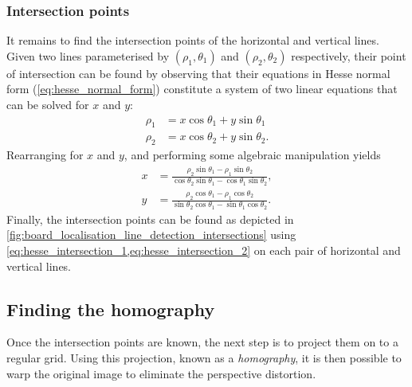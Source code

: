 \documentclass[../report.tex]{subfiles}
\begin{document}
\subsubsection{Intersection points}
It remains to find the intersection points of the horizontal and vertical lines.
Given two lines parameterised by $(\rho_1,\theta_1)$ and $(\rho_2,\theta_2)$ respectively, their point of intersection can be found by observing that their equations in Hesse normal form (\cref{eq:hesse_normal_form}) constitute a system of two linear equations that can be solved for $x$ and $y$:
\begin{align*}
    \rho_1 &= x \cos \theta_1 + y \sin \theta_1 \\
    \rho_2 &= x \cos \theta_2 + y \sin \theta_2.
\end{align*}
Rearranging for $x$ and $y$, and performing some algebraic manipulation yields
\begin{align}
    \label{eq:hesse_intersection_1}
    x &= \frac{\rho_2 \sin \theta_1 - \rho_1 \sin \theta_2}{\cos \theta_2 \sin \theta_1 - \cos \theta_1 \sin \theta_2}, \\
    \label{eq:hesse_intersection_2}
    y &= \frac{\rho_2 \cos \theta_1 - \rho_1 \cos \theta_2}{\sin \theta_2 \cos \theta_1 - \sin \theta_1 \cos \theta_2}.
\end{align}
Finally, the intersection points can be found as depicted in \cref{fig:board_localisation_line_detection_intersections} using \cref{eq:hesse_intersection_1,eq:hesse_intersection_2} on each pair of horizontal and vertical lines.

\subsection{Finding the homography}
\label{sec:find_homography}
Once the intersection points are known, the next step is to project them on to a regular grid. 
Using this projection, known as a \emph{homography}, it is then possible to warp the original image to eliminate the perspective distortion. 
\end{document}
